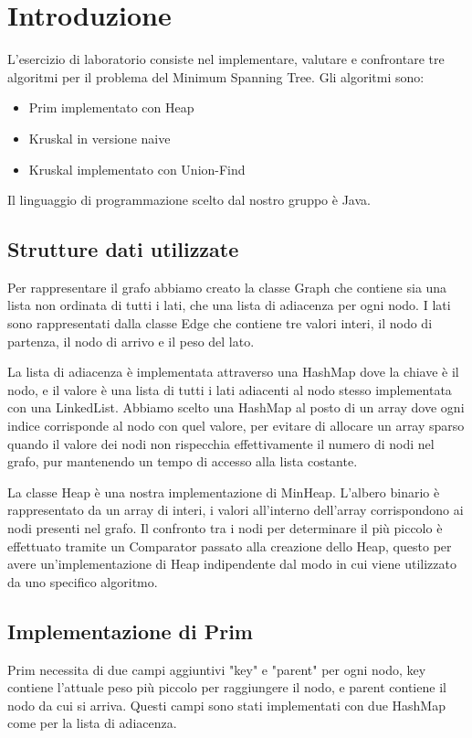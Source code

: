 \section{Introduzione}

L'esercizio di laboratorio consiste nel implementare, valutare e confrontare tre algoritmi per il problema del Minimum Spanning Tree. Gli algoritmi sono:
\begin{itemize}
	\item Prim implementato con Heap
	\item Kruskal in versione naive
	\item Kruskal implementato con Union-Find
\end{itemize}
Il linguaggio di programmazione scelto dal nostro gruppo è Java.


\subsection{Strutture dati utilizzate}

Per rappresentare il grafo abbiamo creato la classe Graph che contiene sia una lista non ordinata di tutti i lati, che una lista di adiacenza per ogni nodo.
I lati sono rappresentati dalla classe Edge che contiene tre valori interi, il nodo di partenza, il nodo di arrivo e il peso del lato.

La lista di adiacenza è implementata attraverso una HashMap dove la chiave è il nodo, e il valore è una lista di tutti i lati adiacenti al nodo stesso implementata con una LinkedList. Abbiamo scelto una HashMap al posto di un array dove ogni indice corrisponde al nodo con quel valore, per evitare di allocare un array sparso quando il valore dei nodi non rispecchia effettivamente il numero di nodi nel grafo, pur mantenendo un tempo di accesso alla lista costante.

La classe Heap è una nostra implementazione di MinHeap. L'albero binario è rappresentato da un array di interi, i valori all'interno dell'array corrispondono ai nodi presenti nel grafo. Il confronto tra i nodi per determinare il più piccolo è effettuato tramite un Comparator passato alla creazione dello Heap, questo per avere un'implementazione di Heap indipendente dal modo in cui viene utilizzato da uno specifico algoritmo.

\subsection{Implementazione di Prim}
Prim necessita di due campi aggiuntivi "key" e "parent" per ogni nodo, key contiene l'attuale peso più piccolo per raggiungere il nodo, e parent contiene il nodo da cui si arriva. Questi campi sono stati implementati con due HashMap come per la lista di adiacenza.

